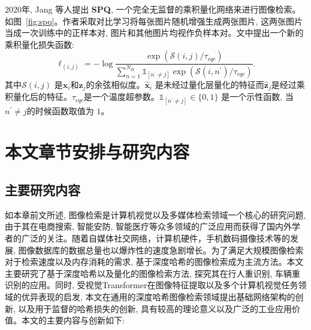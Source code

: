 2020年, Jang 等人提出 \textbf{SPQ}, 一个完全无监督的乘积量化网络来进行图像检索。如图~\ref{fig:spq}。作者采取对比学习将每张图片随机增强生成两张图片, 这两张图片当成一次训练中的正样本对, 图片和其他图片均视作负样本对。文中提出一个新的乘积量化损失函数:
\begin{equation}
    \ell_{(i, j)}=-\log \frac{\exp \left(\mathcal{S}(i, j) / \tau_{c q c}\right)}{\sum_{n=1}^{N_B} \mathbb{1}_{\left[n^{\prime} \neq j\right]} \exp \left(\mathcal{S}\left(i, n^{\prime}\right) / \tau_{c q c}\right)}.
\end{equation}
其中$\mathcal{S}(i, j)$ 是$\mathbf{\hat{x}}_i$和$\mathbf{\hat{z}}_j$的余弦相似度。$\mathbf{\hat{x}}_i$ 是未经过量化层量化的特征而$\mathbf{\hat{z}}_j$是经过乘积量化后的特征。$\tau_{c q c}$是一个温度超参数。$\mathbb{1}_{\left[n^{\prime} \neq j\right]} \in\{0,1\}$ 是一个示性函数, 当$n^{\prime} \neq j$的时候函数取值为 $1$。


\section{本文章节安排与研究内容}
\subsection{主要研究内容}
如本章前文所述, 图像检索是计算机视觉以及多媒体检索领域一个核心的研究问题, 由于其在电商搜索, 智能安防, 智能医疗等众多领域的广泛应用而获得了国内外学者的广泛的关注。随着自媒体社交网络，计算机硬件，手机数码摄像技术等的发展, 图像数据库的数据总量也以爆炸性的速度急剧增长。为了满足大规模图像检索对于检索速度以及内存消耗的需求, 基于深度哈希的图像检索成为主流方法。本文主要研究了基于深度哈希以及量化的图像检索方法, 探究其在行人重识别, 车辆重识别的应用。同时, 受视觉Transformer在图像特征提取以及多个计算机视觉任务领域的优异表现的启发, 本文在通用的深度哈希图像检索领域提出基础网络架构的创新, 以及用于监督的哈希损失的创新, 具有较高的理论意义以及广泛的工业应用价值。本文的主要内容与创新如下: \par

